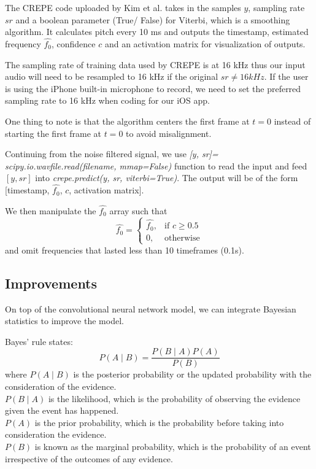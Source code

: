 The CREPE code uploaded by Kim et al. takes in the samples $y$, sampling rate $sr$ and a boolean parameter (True/ False) for Viterbi, which is a smoothing algorithm. 
It calculates pitch every 10 ms and outputs the timestamp, estimated frequency $\hat{f_0}$, confidence $c$ and an activation matrix for visualization of outputs. 

The sampling rate of training data used by CREPE is at 16 kHz thus our input audio will need to be resampled to 16 kHz if the original $sr \neq 16 kHz$. If the user is using the iPhone 
built-in microphone to record, we need to set the preferred sampling rate to 16 kHz  when coding for our iOS app.

One thing to note is that the algorithm centers the first frame at $t=0$ instead of starting the first frame at $t=0$ to avoid misalignment.

Continuing from the noise filtered signal, we use \emph{[y, sr]= scipy.io.wavfile.read(filename, mmap=False)} function to read the input and feed $[y, sr]$ 
into \emph{crepe.predict(y, sr, viterbi=True)}.
The output will be of the form [timestamp, $\hat{f_0}$, $c$, activation matrix].

We then manipulate the $\hat{f_0}$ array such that
\[\hat{f_0}= 
\begin{cases}
    \hat{f_0},      & \text{if } c\geq 0.5\\
    0,              & \text{otherwise}
\end{cases}
\label{creperesult}
\]
and omit frequencies that lasted less than 10 timeframes (0.1s).
\subsection{Improvements}

On top of the convolutional neural network model, we can integrate Bayesian statistics to improve the model.

Bayes' rule states: 
\[P(A\mid B)=\frac {P(B\mid A)P(A)}{P(B)}\]
where $P(A\mid B)$ is the posterior probability or the updated probability with the consideration of the evidence.\\
$P(B\mid A)$ is the likelihood, which is the probability of observing the evidence given the event has happened.\\
$P(A)$ is the prior probability, which is the probability before taking into consideration the evidence.\\
$P(B)$ is known as the marginal probability, which is the probability of an event irrespective of the outcomes of any evidence.


